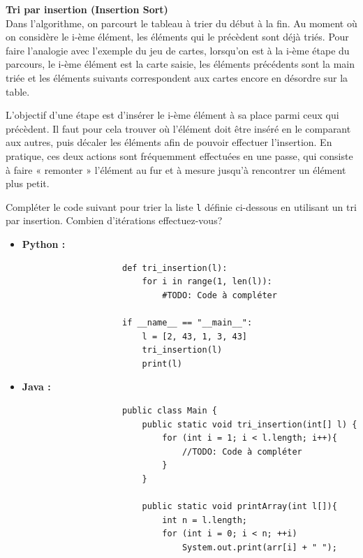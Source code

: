 \begin{Exercice} [20 minutes] \textbf{Tri par insertion (Insertion Sort)} \\

    Dans l'algorithme, on parcourt le tableau à trier du début à la fin. Au moment où on considère le i-ème élément, les éléments qui le précèdent sont déjà triés. Pour faire l'analogie avec l'exemple du jeu de cartes, lorsqu'on est à la i-ème étape du parcours, le i-ème élément est la carte saisie, les éléments précédents sont la main triée et les éléments suivants correspondent aux cartes encore en désordre sur la table. 
    
    L'objectif d'une étape est d'insérer le i-ème élément à sa place parmi ceux qui précèdent. Il faut pour cela trouver où l'élément doit être inséré en le comparant aux autres, puis décaler les éléments afin de pouvoir effectuer l'insertion. En pratique, ces deux actions sont fréquemment effectuées en une passe, qui consiste à faire « remonter » l'élément au fur et à mesure jusqu'à rencontrer un élément plus petit. 
    
    Compléter le code suivant pour trier la liste \lstinline{l} définie ci-dessous en utilisant un tri par insertion. Combien d'itérations effectuez-vous?
    \begin{itemize}
        \item \textbf{Python :}
                \begin{verbatim}
                    def tri_insertion(l):
                        for i in range(1, len(l)):
                            #TODO: Code à compléter
                    
                    if __name__ == "__main__":
                        l = [2, 43, 1, 3, 43]
                        tri_insertion(l)
                        print(l)
                \end{verbatim}
        \item \textbf{Java :}
                \begin{verbatim}
                    public class Main {
                        public static void tri_insertion(int[] l) {
                            for (int i = 1; i < l.length; i++){
                                //TODO: Code à compléter 
                            }
                        }
                        
                        public static void printArray(int l[]){ 
                            int n = l.length; 
                            for (int i = 0; i < n; ++i) 
                                System.out.print(arr[i] + " "); 
                      

\end{verbatim}
\end{itemize}
\end{Exercice}
